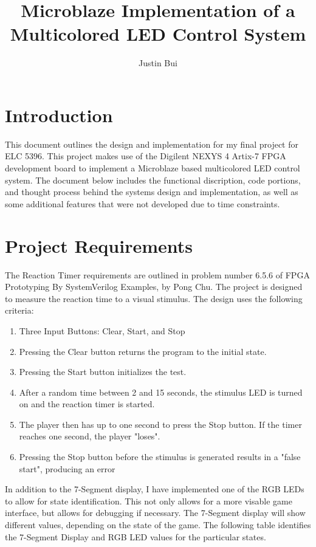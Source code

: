 \documentclass{article}
\author{Justin Bui}
\title{Microblaze Implementation of a Multicolored LED Control System}
\begin{document}
\maketitle
\newpage

\tableofcontents
\newpage

\section{Introduction}
This document outlines the design and implementation for my final project for ELC 5396. This project makes use of the Digilent NEXYS 4 Artix-7 FPGA development board to implement a Microblaze based multicolored LED control system. The document below includes the functional discription, code portions, and thought process behind the systems design and implementation, as well as some additional features that were not developed due to time constraints. 

\section{Project Requirements}
The Reaction Timer requirements are outlined in problem number 6.5.6 of FPGA Prototyping By SystemVerilog Examples, by Pong Chu. The project is designed to measure the reaction time to a visual stimulus. The design uses the following criteria:

\begin{enumerate}
	\item Three Input Buttons: Clear, Start, and Stop
	\item Pressing the Clear button returns the program to the initial state.
	\item Pressing the Start button initializes the test.
	\item After a random time between 2 and 15 seconds, the stimulus LED is turned on and the reaction timer is started.
	\item The player then has up to one second to press the Stop button. If the timer reaches one second, the player "loses".
	\item Pressing the Stop button before the stimulus is generated results in a "false start", producing an error
\end{enumerate} 

In addition to the 7-Segment display, I have implemented one of the RGB LEDs to allow for state identification. This not only allows for a more visable game interface, but allows for debugging if necessary. The 7-Segment display will show different values, depending on the state of the game. The following table identifies the 7-Segment Display and RGB LED values for the particular states.
\end{document}
